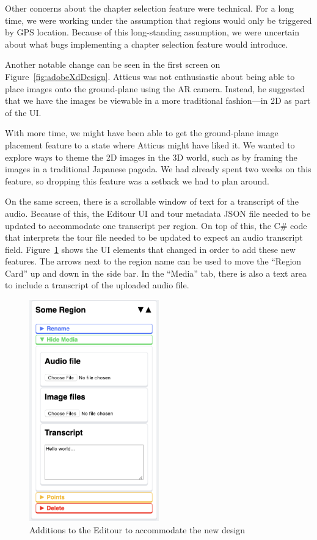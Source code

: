 \documentclass[a4paper, 10pt, american, titlepage]{article}
\begin{document}
Other concerns about the chapter selection feature were technical. For a long
time, we were working under the assumption that regions would only be triggered
by GPS location. Because of this long-standing assumption, we were uncertain
about what bugs implementing a chapter selection feature would introduce.

Another notable change can be seen in the first screen on
Figure~\ref{fig:adobeXdDesign}. Atticus was not enthusiastic about being able
to place images onto the ground-plane using the AR camera. Instead, he
suggested that we have the images be viewable in a more traditional
fashion---in 2D as part of the UI.

With more time, we might have been able to get the ground-plane image placement
feature to a state where Atticus might have liked it. We wanted to explore ways
to theme the 2D images in the 3D world, such as by framing the images in a
traditional Japanese pagoda. We had already spent two weeks on this feature, so
dropping this feature was a setback we had to plan around.

On the same screen, there is a scrollable window of text for a transcript of
the audio. Because of this, the Editour UI and tour metadata JSON file needed
to be updated to accommodate one transcript per region. On top of this, the C\#
code that interprets the tour file needed to be updated to expect an audio
transcript field.  Figure~\ref{fig:editourAdditions} shows the UI elements that
changed in order to add these new features. The arrows next to the region name
can be used to move the ``Region Card'' up and down in the side bar. In the
``Media'' tab, there is also a text area to include a transcript of the
uploaded audio file.

\begin{figure}[h]
	\centering
	\includegraphics[width=0.5\textwidth]{editour-additions.png}
	\caption{Additions to the Editour to accommodate the new design}
	\label{fig:editourAdditions}
\end{figure}
\end{document}
